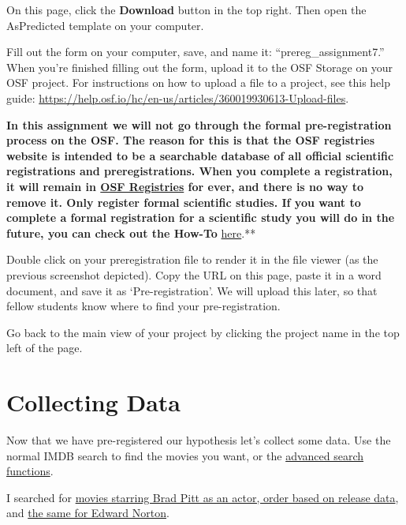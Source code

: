 \documentclass[
  oneside]{book}
\begin{document}
On this page, click the \textbf{Download} button in the top right. Then open the
AsPredicted template on your computer.

Fill out the form on your computer, save, and name it: ``prereg\_assignment7.''
When you're finished filling out the form, upload it to the OSF Storage on your
OSF project. For instructions on how to upload a file to a project, see this
help guide: \url{https://help.osf.io/hc/en-us/articles/360019930613-Upload-files}.

\textbf{In this assignment we will not go through the formal pre-registration process on the OSF. The reason for this is that the OSF registries website is intended to be a searchable database of all official scientific registrations and preregistrations. When you complete a registration, it will remain in \href{https://osf.io/registries/}{OSF Registries} for ever, and there is no way to remove it. Only register formal scientific studies. If you want to complete a formal registration for a scientific study you will do in the future, you can check out the How-To} \href{https://help.osf.io/article/158-create-a-preregistration}{here}.**

Double click on your preregistration file to render it in the file viewer (as
the previous screenshot depicted). Copy the URL on this page, paste it in a word
document, and save it as `Pre-registration'. We will upload this later, so that
fellow students know where to find your pre-registration.

Go back to the main view of your project by clicking the project name in the top
left of the page.

\hypertarget{collecting-data}{%
\section{Collecting Data}\label{collecting-data}}

Now that we have pre-registered our hypothesis let's collect some data. Use the
normal IMDB search to find the movies you want, or the \href{http://www.imdb.com/search/}{advanced search
functions}.

I searched for \href{http://www.imdb.com/filmosearch?role=nm0000093\&explore=title_type\&mode=detail\&page=1\&title_type=movie\&ref_=filmo_ref_job_typ\&sort=release_date,desc\&job_type=actor}{movies starring Brad Pitt as an actor, order based on release
data},
and \href{http://www.imdb.com/filmosearch?role=nm0001570\&explore=title_type\&mode=detail\&page=1\&title_type=movie\&ref_=filmo_ref_job_typ\&sort=release_date,desc\&job_type=actor}{the same for Edward
Norton}.
\end{document}
